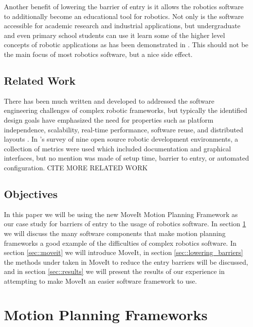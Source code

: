 \documentclass[10pt,journal,compsoc]{joser1}
\begin{document}
{Another benefit of lowering the barrier of entry is it allows the robotics software to additionally become an educational tool for robotics. Not only is the software accessible for academic research and industrial applications, but undergraduate and even primary school students can use it learn some of the higher level concepts of robotic applications as has been demonstrated in \cite{correll2013one, moll2011teaching}. This should not be the main focus of most robotics software, but a nice side effect.

\subsection{Related Work}

There has been much written and developed to addressed the software engineering challenges of complex robotic frameworks, but typically the identified design goals have emphasized the need for properties such as platform independence, scalability, real-time performance, software reuse, and distributed layouts \cite{realtime_framework, collett2005player, kramer2007development}. In \cite{kramer2007development}'s survey of nine open source robotic development environments, a collection of metrics were used which included documentation and graphical interfaces, but no mention was made of setup time, barrier to entry, or automated configuration. CITE MORE RELATED WORK

\subsection{Objectives}

In this paper we will be using the new MoveIt Motion Planning Framework as our case study for barriers of entry to the usage of robotics software. In section \ref{sec::motion_planning} we will discuss the many software components that make motion planning frameworks a good example of the difficulties of complex robotics software. In section \ref{sec::moveit} we will introduce MoveIt, in section \ref{sec::lowering_barriers} the methods under taken in MoveIt to reduce the entry barriers will be discussed, and in section \ref{sec::results} we will present the results of our experience in attempting to make MoveIt an easier software framework to use.

\section{Motion Planning Frameworks}
\label{sec::motion_planning}

}
\end{document}
